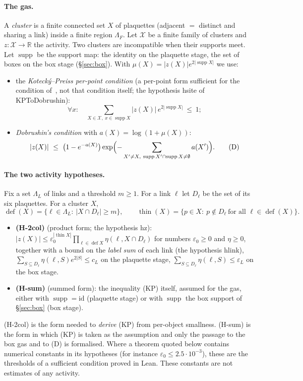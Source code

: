\documentclass[11pt,a4paper]{article}
\theoremstyle{definition}
\theoremstyle{remark}
\DeclareRobustCommand{\lean}[1]{{\ttfamily\renewcommand{\_}{\textunderscore\allowbreak}#1}}
\newcommand{\R}{\mathbb{R}}
\newcommand{\thin}{\operatorname{thin}}
\newcommand{\dfc}{\operatorname{def}}
\newcommand{\supp}{\operatorname{supp}}
\begin{document}
\paragraph{The gas.} A \emph{cluster} is a finite connected set $X$ of plaquettes (adjacent $=$ distinct and sharing a link) inside a finite region $\Lambda_F$. Let $\mathcal X$ be a finite family of clusters and $z:\mathcal X\to\R$ the activity. Two clusters are incompatible when their supports meet. Let $\supp$ be the support map: the identity on the plaquette stage, the set of boxes on the box stage (\S\ref{sec:box}). With $\mu(X)=|z(X)|e^{2|\supp X|}$ we use:
\begin{itemize}[leftmargin=2em]
\item the \emph{Kotecký--Preiss per-point condition} (a per-point form sufficient for the condition of~\cite{KP}, not that condition itself; the hypothesis \lean{hsite} of \lean{KPToDobrushin}):
\[
\forall x:\quad \sum_{X\in\mathcal X,\ x\in\supp X}|z(X)|\,e^{2|\supp X|}\ \le\ 1;\tag{KP}
\]
\item \emph{Dobrushin's condition} with $a(X)=\log(1+\mu(X))$:
\[
|z(X)|\ \le\ \bigl(1-e^{-a(X)}\bigr)\exp\Bigl(-\sum_{X'\ne X,\ \supp X'\cap\supp X\neq\emptyset}a(X')\Bigr).\tag{D}
\]
\end{itemize}

\paragraph{The two activity hypotheses.} Fix a set $\Lambda_L$ of links and a threshold $m\ge1$. For a link $\ell$ let $D_\ell$ be the set of its six plaquettes. For a cluster $X$,
\[
\dfc(X)=\{\ell\in\Lambda_L:\ |X\cap D_\ell|\ge m\},\qquad \thin(X)=\{p\in X:\ p\notin D_\ell\ \text{for all }\ell\in\dfc(X)\}.
\]
\begin{itemize}[leftmargin=2em]
\item \textbf{(H-2col)} (product form; the hypothesis \lean{hz}): $|z(X)|\le\varepsilon_0^{|\thin X|}\prod_{\ell\in\dfc X}\eta(\ell,X\cap D_\ell)$ for numbers $\varepsilon_0\ge0$ and $\eta\ge0$, together with a bound on the \emph{label sum} of each link (the hypothesis \lean{hlink}), $\sum_{S\subseteq D_\ell}\eta(\ell,S)e^{2|S|}\le c_L$ on the plaquette stage, $\sum_{S\subseteq D_\ell}\eta(\ell,S)\le\varepsilon_L$ on the box stage.
\item \textbf{(H-sum)} (summed form): the inequality (KP) itself, assumed for the gas, either with $\supp=\mathrm{id}$ (plaquette stage) or with $\supp$ the box support of \S\ref{sec:box} (box stage).
\end{itemize}
(H-2col) is the form needed to \emph{derive} (KP) from per-object smallness. (H-sum) is the form in which (KP) is taken as the assumption and only the passage to the box gas and to (D) is formalised. Where a theorem quoted below contains numerical constants in its hypotheses (for instance $\varepsilon_0\le2.5\cdot10^{-3}$), these are the thresholds of a sufficient condition proved in Lean. These constants are not estimates of any activity.
\end{document}
